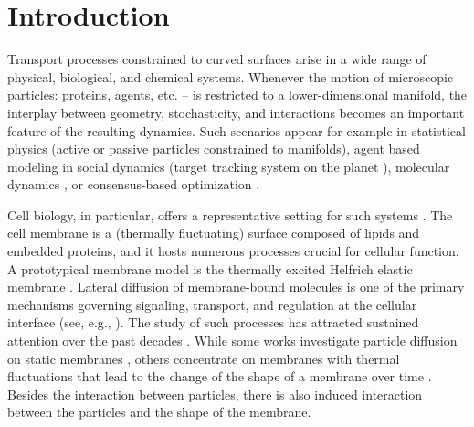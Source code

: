 \documentclass[11pt, a4paper]{article}
\begin{document}
\section{Introduction}



Transport processes constrained to curved surfaces arise in a wide range of physical, biological, and chemical systems. Whenever the motion of microscopic particles: proteins, agents, etc. -- is restricted to a lower-dimensional manifold, the interplay between geometry, stochasticity, and interactions becomes an important feature of the resulting dynamics. Such scenarios appear for example in statistical physics (active or passive particles constrained to manifolds), agent based modeling in social dynamics  (target tracking system on the planet \cite{choi2023multi}), molecular dynamics \cite{ciccotti2008projection,LelievreRoussetStoltz,lindahl2008membrane}, or consensus-based optimization \cite{Fornasier2021}. 




Cell biology, in particular, offers a representative setting for such systems \cite{bressloff2013stochastic, lipowsky1995structure}.
The cell membrane is a  (thermally fluctuating) surface composed of lipids and embedded proteins, and it hosts numerous processes crucial for cellular function. A prototypical membrane model is the thermally excited Helfrich elastic membrane \cite{naji2007diffusion,reister2005lateral}.  Lateral diffusion of membrane-bound molecules is one of the primary mechanisms governing signaling, transport, and regulation at the cellular interface (see, e.g., \cite{bressloff2013stochastic}). The study of such processes has attracted sustained attention over the past decades \cite{castro2010brownian,lipowsky1995structure,saxton1997single}. While some works investigate particle diffusion on static membranes \cite{reister2005lateral}, 
others concentrate on membranes with thermal fluctuations that lead to the change of the shape of a membrane over time \cite{gov2004membrane,reister2007hybrid,  reister2010diffusing}.
Besides the interaction between particles, there is also induced interaction between the particles and the shape of the membrane.  
\end{document}
